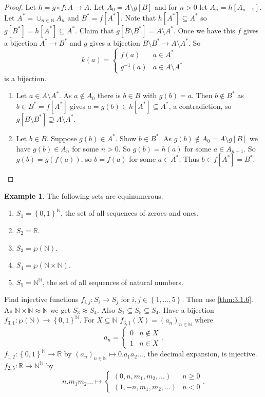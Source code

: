 \documentclass{article}
\newcommand{\N}{\mathbb{N}}
\newcommand{\R}{\mathbb{R}}
\newcommand{\rb}[1]{\left( #1 \right)}
\renewcommand{\sb}[1]{\left[ #1 \right]}
\newcommand{\cb}[1]{\left\{ #1 \right\}}
\theoremstyle{definition}\newtheorem{definition}{Definition}[subsection]
\theoremstyle{definition}\newtheorem{remark}[definition]{Remark}
\theoremstyle{definition}\newtheorem*{example}{Example}
\theoremstyle{definition}\newtheorem*{note}{Note}
\begin{document}
\begin{proof}
Let $ h = g \circ f : A \to A $. Let $ A_0 = A \setminus g\sb{B} $ and for $ n > 0 $ let $ A_n = h\sb{A_{n - 1}} $. Let $ A^* = \cup_{n \in \N} A_n $ and $ B^* = f\sb{A^*} $. Note that $ h\sb{A^*} \subseteq A^* $ so $ g\sb{B^*} = h\sb{A^*} \subseteq A^* $. Claim that $ g\sb{B \setminus B^*} = A \setminus A^* $. Once we have this $ f $ gives a bijection $ A^* \to B^* $ and $ g $ gives a bijection $ B \setminus B^* \to A \setminus A^*$. So
$$ k\rb{a} = \begin{cases} f\rb{a} & a \in A^* \\ g^{-1}\rb{a} & a \in A \setminus A^* \end{cases} $$
is a bijection.
\begin{enumerate}
\item Let $ a \in A \setminus A^* $. As $ a \notin A_0 $ there is $ b \in B $ with $ g\rb{b} = a $. Then $ b \notin B^* $ as $ b \in B^* = f\sb{A^*} $ gives $ a = g\rb{b} \in h\sb{A^*} \subseteq A^* $, a contradiction, so $ g\sb{B \setminus B^*} \supseteq A \setminus A^* $.
\item Let $ b \in B $. Suppose $ g\rb{b} \in A^* $. Show $ b \in B^* $. As $ g\rb{b} \notin A_0 = A \setminus g\sb{B} $ we have $ g\rb{b} \in A_n $ for some $ n > 0 $. So $ g\rb{b} = h\rb{a} $ for some $ a \in A_{n - 1} $. So $ g\rb{b} = g\rb{f\rb{a}} $, so $ b = f\rb{a} $ for some $ a \in A^* $. Thus $ b \in f\sb{A^*} = B^* $.
\end{enumerate}
\end{proof}

\begin{example}
The following sets are equinumerous.
\begin{enumerate}
\item $ S_1 = \cb{0, 1}^\N $, the set of all sequences of zeroes and ones.
\item $ S_2 = \R $.
\item $ S_3 = \wp\rb{\N} $.
\item $ S_4 = \wp\rb{\N \times \N} $.
\item $ S_5 = \N^\N $, the set of all sequences of natural numbers.
\end{enumerate}
Find injective functions $ f_{i, j} : S_i \to S_j $ for $ i, j \in \cb{1, \dots, 5} $. Then use \ref{thm:3.1.6}. As $ \N \times \N \approx \N $ we get $ S_3 \approx S_4 $. Also $ S_1 \subseteq S_5 \subseteq S_4 $. Have a bijection $ f_{3, 1} : \wp\rb{\N} \to \cb{0, 1}^\N $. For $ X \subseteq \N $ $ f_{3, 1}\rb{X} = \rb{a_n}_{n \in \N} $ where
$$ a_n = \begin{cases} 0 & n \notin X \\ 1 & n \in X \end{cases}. $$
$ f_{1, 2} : \cb{0, 1}^\N \to \R $ by $ \rb{a_n}_{n \in \N} \mapsto 0 . a_1a_2 \dots $, the decimal expansion, is injective. $ f_{2, 5} : \R \to \N^\N $ by
$$ n . m_1m_2 \dots \mapsto \begin{cases} \rb{0, n, m_1, m_2, \dots} & n \ge 0 \\ \rb{1, -n, m_1, m_2, \dots} & n < 0 \end{cases}. $$
\end{example}
\end{document}
